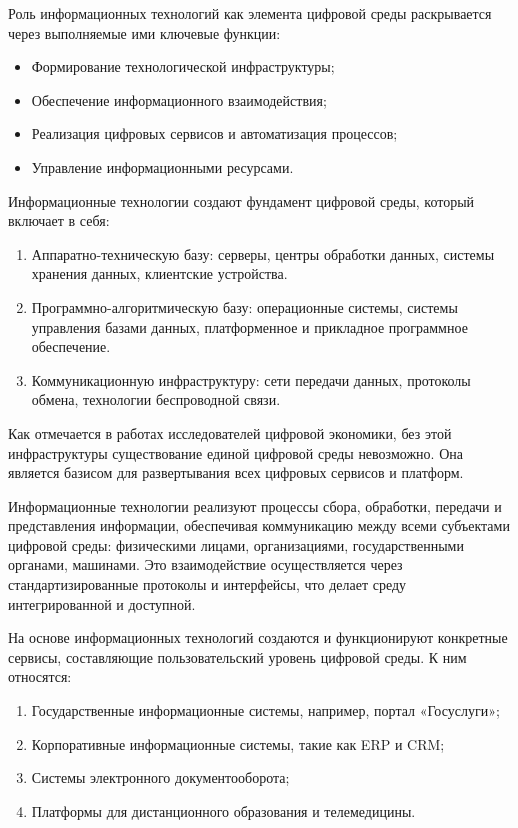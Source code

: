 \documentclass{ou}
\begin{document}
Роль информационных технологий как элемента цифровой среды раскрывается через выполняемые ими ключевые функции:
\begin{itemize}[label=-, leftmargin=0em, itemindent=3.35em, nosep]
\item Формирование технологической инфраструктуры;
\item Обеспечение информационного взаимодействия;
\item Реализация цифровых сервисов и автоматизация процессов;
\item Управление информационными ресурсами\cite{Cspo}.
\end{itemize}

Информационные технологии создают фундамент цифровой среды, который включает в себя:
\begin{enumerate}[leftmargin=0em, itemindent=3.75em, nosep, label=\arabic*)]
\item Аппаратно-техническую базу: серверы, центры обработки данных, системы хранения данных, клиентские устройства.
\item Программно-алгоритмическую базу: операционные системы, системы управления базами данных, платформенное и прикладное программное обеспечение.
\item Коммуникационную инфраструктуру: сети передачи данных, протоколы обмена, технологии беспроводной связи\cite{skyeng}.
\end{enumerate}

Как отмечается в работах исследователей цифровой экономики, без этой инфраструктуры существование единой цифровой среды невозможно. Она является базисом для развертывания всех цифровых сервисов и платформ.

Информационные технологии реализуют процессы сбора, обработки, передачи и представления информации, обеспечивая коммуникацию между всеми субъектами цифровой среды: физическими лицами, организациями, государственными органами, машинами. Это взаимодействие осуществляется через стандартизированные протоколы и интерфейсы, что делает среду интегрированной и доступной.

На основе информационных технологий создаются и функционируют конкретные сервисы, составляющие пользовательский уровень цифровой среды. К ним относятся:
\begin{enumerate}[leftmargin=0em, itemindent=3.75em, nosep, label=\arabic*)]
\item Государственные информационные системы, например, портал «Госуслуги»;
\item Корпоративные информационные системы, такие как ERP и CRM;
\item Системы электронного документооборота;
\item Платформы для дистанционного образования и телемедицины\cite{sviazexpo}.
\end{enumerate}
\end{document}
